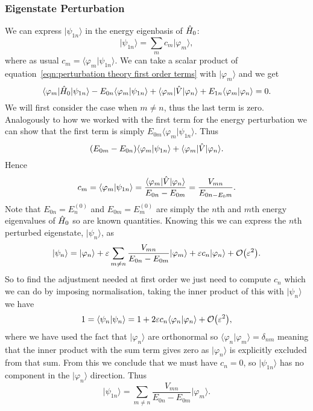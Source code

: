 \documentclass[a4paper]{article}
\renewcommand{\ket}[1]{\vert {#1} \rangle}
\renewcommand{\bra}[1]{\langle {#1} \vert}
\renewcommand{\braket}[2]{\langle {#1} \vert {#2} \rangle}
\theoremstyle{definition}
\begin{document}
    \subsubsection{Eigenstate Perturbation}
    We can express \(\ket{\psi_{1n}}\) in the energy eigenbasis of \(\hat{H}_0\):
    \[\ket{\psi_{1n}} = \sum_{m}c_m\ket{\varphi_m},\]
    where as usual \(c_m = \braket{\varphi_m}{\psi_{1n}}\).
    We can take a scalar product of equation~\ref{eqn:perturbation theory first order terms} with \(\ket{\varphi_m}\) and we get
    \[\bra{\varphi_m}\operator{H}_0\ket{\psi_{1n}} - E_{0n}\braket{\varphi_m}{\psi_{1n}} + \bra{\varphi_m}\operator{V}\ket{\varphi_n} + E_{1n}\braket{\varphi_m}{\varphi_n} = 0.\]
    We will first consider the case when \(m \ne n\), thus the last term is zero.
    Analogously to how we worked with the first term for the energy perturbation we can show that the first term is simply \(E_{0m}\braket{\varphi_m}{\psi_{1n}}\).
    Thus
    \[(E_{0m} - E_{0n})\braket{\varphi_m}{\psi_{1n}} + \bra{\varphi_m}\operator{V}\ket{\varphi_n}.\]
    Hence
    \[c_m = \braket{\varphi_m}{\psi_{1n}} = \frac{\bra{\varphi_m}\operator{V}\ket{\varphi_n}}{E_{0n} - E_{0m}} = \frac{V_{mn}}{E_{0n - E_0m}}.\]
    Note that \(E_{0n} = E_n^{(0)}\) and \(E_{0m} = E_m^{(0)}\) are simply the \(n\)th and \(m\)th energy eigenvalues of \(\hat{H}_0\) so are known quantities.
    Knowing this we can express the \(n\)th perturbed eigenstate, \(\ket{\psi_{n}}\), as
    \[\ket{\psi_{n}} = \ket{\varphi_n} + \varepsilon\sum_{m\ne n}\frac{V_{mn}}{E_{0n} - E_{0m}}\ket{\varphi_m} + \varepsilon c_n\ket{\varphi_n} + \order{\varepsilon^2}.\]
    So to find the adjustment needed at first order we just need to compute \(c_n\) which we can do by imposing normalisation, taking the inner product of this with \(\ket{\psi_{n}}\) we have
    \[1 = \braket{\psi_{n}}{\psi_{n}} = 1 + 2\varepsilon c_n\braket{\varphi_n}{\varphi_n} + \order{\varepsilon^2},\]
    where we have used the fact that \(\ket{\varphi_n}\) are orthonormal so \(\braket{\varphi_n}{\varphi_m} = \delta_{nm}\) meaning that the inner product with the sum term gives zero as \(\ket{\varphi_n}\) is explicitly excluded from that sum.
    From this we conclude that we must have \(c_n = 0\), so \(\ket{\psi_{1n}}\) has no component in the \(\ket{\varphi_n}\) direction.
    Thus
    \[\ket{\psi_{1n}} = \sum_{m\ne n} \frac{V_{mn}}{E_{0n} - E_{0m}}\ket{\varphi_m}.\]
    
\end{document}
